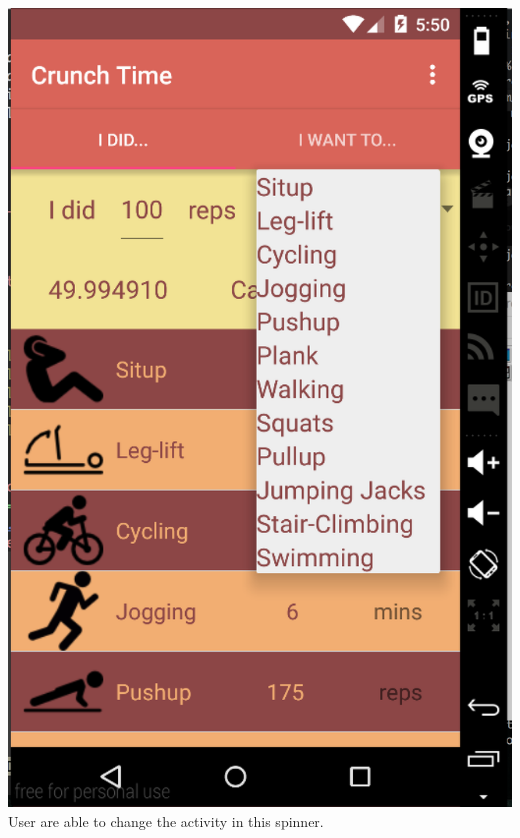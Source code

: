 \documentclass[11pt]{article}
\begin{document}
\includegraphics[scale=0.3]{shot2.png}\\
User are able to change the activity in this spinner.\\
\end{document}

